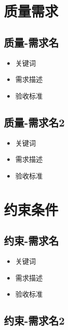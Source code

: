 \documentclass[hyperref, a4paper]{ctexart}
\providecommand{\tightlist}{%
  \setlength{\itemsep}{0pt}\setlength{\parskip}{0pt}}
\begin{document}
\hypertarget{ux8d28ux91cfux9700ux6c42}{%
\section{质量需求}\label{ux8d28ux91cfux9700ux6c42}}

\hypertarget{ux8d28ux91cf-ux9700ux6c42ux540d}{%
\subsection{质量-需求名}\label{ux8d28ux91cf-ux9700ux6c42ux540d}}

\begin{itemize}
\tightlist
\item
  关键词
\item
  需求描述
\item
  验收标准
\end{itemize}

\hypertarget{ux8d28ux91cf-ux9700ux6c42ux540d2}{%
\subsection{质量-需求名2}\label{ux8d28ux91cf-ux9700ux6c42ux540d2}}

\begin{itemize}
\tightlist
\item
  关键词
\item
  需求描述
\item
  验收标准
\end{itemize}

\hypertarget{ux7ea6ux675fux6761ux4ef6}{%
\section{约束条件}\label{ux7ea6ux675fux6761ux4ef6}}

\hypertarget{ux7ea6ux675f-ux9700ux6c42ux540d}{%
\subsection{约束-需求名}\label{ux7ea6ux675f-ux9700ux6c42ux540d}}

\begin{itemize}
\tightlist
\item
  关键词
\item
  需求描述
\item
  验收标准
\end{itemize}

\hypertarget{ux7ea6ux675f-ux9700ux6c42ux540d2}{%
\subsection{约束-需求名2}\label{ux7ea6ux675f-ux9700ux6c42ux540d2}}
\end{document}
